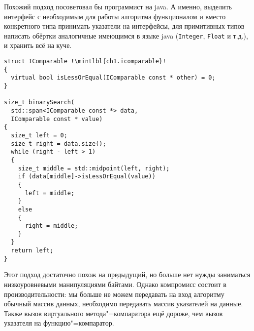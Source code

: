 Похожий подход посоветовал бы программист на java.
А именно, выделить интерфейс с необходимым для работы алгоритма функционалом и вместо конкретного типа принимать указатели на интерфейсы, для примитивных типов написать обёртки аналогичные имеющимся в языке java (\texttt{Integer}, \texttt{Float} и т.д.), и хранить всё на куче.
\begin{verbatim}
struct IComparable !\mintlbl{ch1.icomparable}!
{
  virtual bool isLessOrEqual(IComparable const * other) = 0;
}

size_t binarySearch(
  std::span<IComparable const *> data,
  IComparable const * value)
{
  size_t left = 0;
  size_t right = data.size();
  while (right - left > 1)
  {
    size_t middle = std::midpoint(left, right);
    if (data[middle]->isLessOrEqual(value))
    {
      left = middle;
    }
    else
    {
      right = middle;
    }
  }
  return left;
}
\end{verbatim}
Этот подход достаточно похож на предыдущий, но больше нет нужды заниматься низкоуровневыми манипуляциями байтами.
Однако компромисс состоит в производительности: мы больше не можем передавать на вход алгоритму обычный массив данных, необходимо передавать массив указателей на данные.
Также вызов виртуального метода"=компаратора ещё дороже, чем вызов указателя на функцию"=компаратор.

